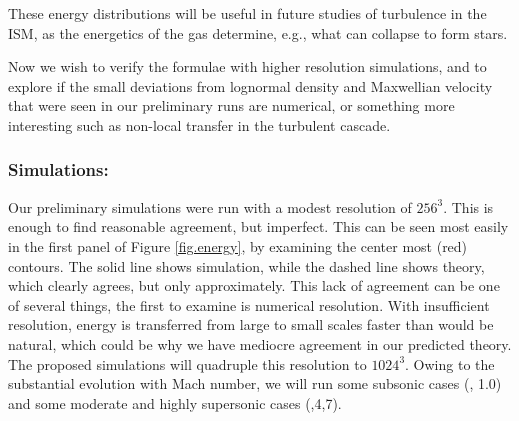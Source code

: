 These energy distributions will be useful
in future studies of turbulence in the ISM, as the energetics of the gas
determine, e.g., what can collapse to form stars.  

Now we wish to verify the formulae with higher resolution simulations, and to
explore if the small deviations from lognormal density and Maxwellian velocity
that were seen in our preliminary runs are numerical, or something more
interesting such as non-local transfer in the turbulent cascade.

\subsubsection{Simulations: \nameTurbulence}
\label{subsec.turb_sims}

Our preliminary simulations were run with a modest resolution of $256^3$.  This
is enough to find reasonable agreement, but imperfect. This can be seen most
easily in the first panel of Figure \ref{fig.energy}, by examining the center
most (red) contours. The solid line shows simulation, while the dashed line
shows theory, which clearly agrees, but only approximately.  This lack of
agreement can be one of several things, the first to examine is numerical
resolution.  With insufficient resolution, energy is transferred from large to
small scales faster than would be natural, which could be why we have mediocre
agreement in our predicted theory.  The proposed simulations will quadruple this
resolution to $1024^3$.  Owing to the substantial evolution with Mach number, we
will run some subsonic cases (, 1.0) and some moderate and highly
supersonic cases (,4,7).  
